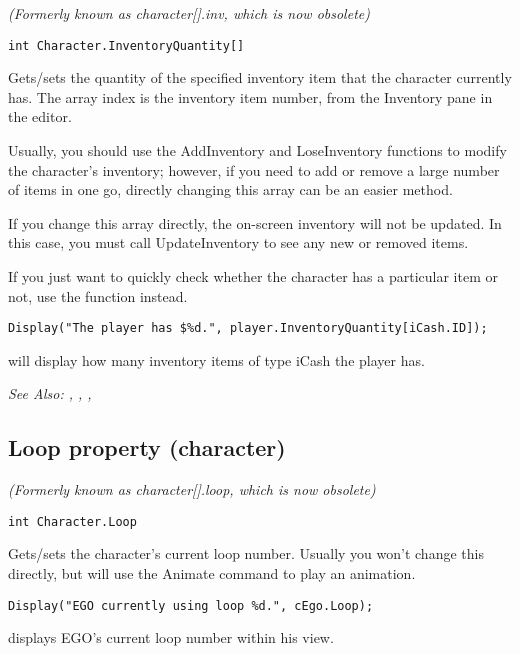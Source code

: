 \it{(Formerly known as character[].inv, which is now obsolete)}

\begin{verbatim}
int Character.InventoryQuantity[]
\end{verbatim}
Gets/sets the quantity of the specified inventory item that the character currently has.
The array index is the inventory item number, from the Inventory pane in the editor.

Usually, you should use the AddInventory and LoseInventory functions to modify the
character's inventory; however, if you need to add or remove a large number of items
in one go, directly changing this array can be an easier method.

If you change this array directly, the on-screen inventory will not be updated. In this
case, you must call UpdateInventory to see any new or removed items.

If you just want to quickly check whether the character has a particular item or
not, use the  function instead.

\begin{verbatim}
Display("The player has $%d.", player.InventoryQuantity[iCash.ID]);
\end{verbatim}
will display how many inventory items of type iCash the player has.

\it{See Also:} ,
,
,


\subsection{Loop property (character)}\label{Character.Loop}%

\it{(Formerly known as character[].loop, which is now obsolete)}

\begin{verbatim}
int Character.Loop
\end{verbatim}
Gets/sets the character's current loop number. Usually you won't change this
directly, but will use the Animate command to play an animation.

\begin{verbatim}
Display("EGO currently using loop %d.", cEgo.Loop);
\end{verbatim}
displays EGO's current loop number within his view.

